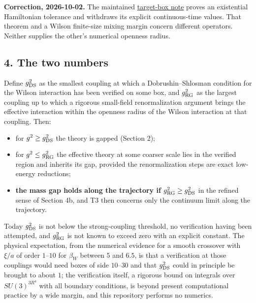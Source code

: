 \documentclass[11pt,a4paper]{article}
\newcommand{\tightlist}{\setlength{\itemsep}{0pt}\setlength{\parskip}{0pt}}
\begin{document}
\textbf{Correction, 2026-10-02.} The maintained
\href{strong-coupling-target-box.md}{target-box note} proves an
existential Hamiltonian tolerance and withdraws its explicit
continuous-time values. That theorem and a Wilson finite-size mixing
margin concern different operators. Neither supplies the other's
numerical openness radius.

\subsection{4. The two numbers}\label{the-two-numbers}

Define \(g_{\rm DS}^2\) as the smallest coupling at which a
Dobrushin--Shlosman condition for the Wilson interaction has been
verified on some box, and \(g_{\rm RG}^2\) as the largest coupling up to
which a rigorous small-field renormalization argument brings the
effective interaction within the openness radius of the Wilson
interaction at that coupling. Then:

\begin{itemize}
\tightlist
\item
  for \(g^2\ge g_{\rm DS}^2\) the theory is gapped (Section 2);
\item
  for \(g^2\le g_{\rm RG}^2\) the effective theory at some coarser scale
  lies in the verified region and inherits its gap, provided the
  renormalization steps are exact low-energy reductions;
\item
  \textbf{the mass gap holds along the trajectory if
  \(g_{\rm RG}^2\ge g_{\rm DS}^2\)} in the refined sense of Section 4b,
  and T3 then concerns only the continuum limit along the trajectory.
\end{itemize}

Today \(g_{\rm DS}^2\) is not below the strong-coupling threshold, no
verification having been attempted, and \(g_{\rm RG}^2\) is not known to
exceed zero with an explicit constant. The physical expectation, from
the numerical evidence for a smooth crossover with \(\xi/a\) of order
\(1\)--\(10\) for \(\beta_W\) between \(5\) and \(6.5\), is that a
verification at those couplings would need boxes of side \(10\)--\(30\)
and that \(g_{\rm DS}^2\) could in principle be brought to about \(1\);
the verification itself, a rigorous bound on integrals over
\(SU(3)^{3R^4}\) with all boundary conditions, is beyond present
computational practice by a wide margin, and this repository performs no
numerics.
\end{document}
